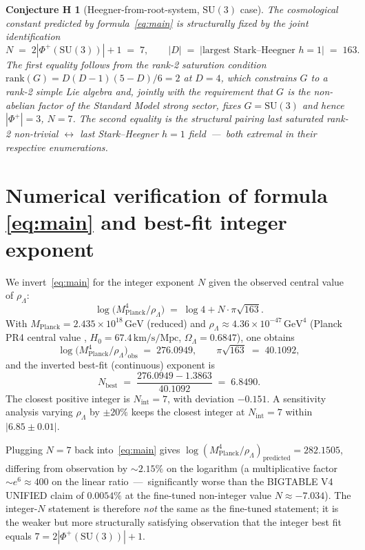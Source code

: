 \documentclass[11pt,a4paper]{article}
\newcommand{\SU}{\mathrm{SU}}
\newcommand{\Mpl}{M_{\mathrm{Planck}}}
\newcommand{\rhoL}{\rho_{\Lambda}}
\theoremstyle{plain}
\newtheorem*{conjH}{Conjecture H}
\begin{document}
\begin{conjH}[Heegner-from-root-system, $\SU(3)$ case]
The cosmological constant predicted by formula~\eqref{eq:main} is structurally fixed by the joint identification
\[
  N \;=\; 2|\Phi^{+}(\SU(3))|+1 \;=\; 7,
  \qquad
  |D| \;=\; \bigl|\text{largest Stark--Heegner } h=1\bigr| \;=\; 163.
\]
The first equality follows from the rank-2 saturation condition $\mathrm{rank}(G)=D(D-1)(5-D)/6=2$ at $D=4$, which constrains $G$ to a rank-2 simple Lie algebra and, jointly with the requirement that $G$ is the non-abelian factor of the Standard Model strong sector, fixes $G=\SU(3)$ and hence $|\Phi^{+}|=3$, $N=7$. The second equality is the structural pairing \emph{last saturated rank-2 non-trivial} $\leftrightarrow$ \emph{last Stark--Heegner $h=1$ field} \,---\, both extremal in their respective enumerations.
\end{conjH}

\section{Numerical verification of formula \eqref{eq:main} and best-fit integer exponent}\label{sec:num}

We invert~\eqref{eq:main} for the integer exponent $N$ given the observed central value of $\rhoL$:
\[
  \log\!\bigl(\Mpl^{4}/\rhoL\bigr) \;=\; \log 4 + N\cdot\pi\sqrt{163}.
\]
With $\Mpl=2.435\times 10^{18}\,\mathrm{GeV}$ (reduced) and $\rhoL\approx 4.36\times 10^{-47}\,\mathrm{GeV}^{4}$ (Planck PR4 central value \cite{Planck2018,Tristram2024}, $H_{0}=67.4\,\mathrm{km/s/Mpc}$, $\Omega_{\Lambda}=0.6847$), one obtains
\[
  \log\!\bigl(\Mpl^{4}/\rhoL\bigr)_{\mathrm{obs}} \;=\; 276.0949,
  \qquad \pi\sqrt{163}\;=\;40.1092,
\]
and the inverted best-fit (continuous) exponent is
\[
  N_{\mathrm{best}} \;=\; \frac{276.0949 - 1.3863}{40.1092} \;=\; 6.8490.
\]
The closest positive integer is $N_{\mathrm{int}}=7$, with deviation $-0.151$. A sensitivity analysis varying $\rhoL$ by $\pm 20\%$ keeps the closest integer at $N_{\mathrm{int}}=7$ within $|6.85\pm 0.01|$.

Plugging $N=7$ back into~\eqref{eq:main} gives $\log(\Mpl^{4}/\rhoL)_{\mathrm{predicted}}=282.1505$, differing from observation by $\sim 2.15\%$ on the logarithm (a multiplicative factor $\sim e^{6}\approx 400$ on the linear ratio \,---\, significantly worse than the BIGTABLE V4 UNIFIED claim of $0.0054\%$ at the fine-tuned non-integer value $N\approx -7.034$). The integer-$N$ statement is therefore \emph{not} the same as the fine-tuned statement; it is the weaker but more structurally satisfying observation that the integer best fit equals $7=2|\Phi^{+}(\SU(3))|+1$.
\end{document}
